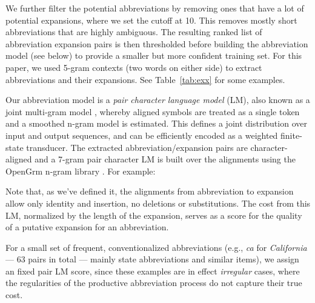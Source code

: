 \documentclass[11pt]{article}
\begin{document}
We further filter the potential abbreviations by removing ones that have a lot
of potential expansions, where we set the cutoff at 10. This removes mostly
short abbreviations that are highly ambiguous.  The resulting ranked list of
abbreviation expansion pairs is then thresholded before building the
abbreviation model (see below) to provide a smaller but more confident training
set. For this paper, we used 5-gram contexts (two words on either side) to
extract abbreviations and their expansions. See Table~\ref{tab:exx} for some
examples.

Our abbreviation model is a \emph{pair character language model} (LM), also
known as a joint multi-gram model \cite{bisani2008joint}, whereby aligned
symbols are treated as a single token and a smoothed n-gram model is
estimated. This defines a joint distribution over input and output sequences,
and can be efficiently encoded as a weighted finite-state transducer. The
extracted abbreviation/expansion pairs are character-aligned and a 7-gram pair
character LM is built over the alignments using the OpenGrm n-gram library
\cite{Roark:EtAl:12}.  For example:

\hspace*{0.3in}{\tt c:c $\epsilon$:e $\epsilon$:n t:t $\epsilon$:e r:r}

\noindent Note that, as we've defined it, the alignments from abbreviation to
expansion allow only identity and insertion, no deletions or substitutions. The
cost from this LM, normalized by the length of the expansion, serves as a score
for the quality of a putative expansion for an abbreviation.

For a small set of frequent, conventionalized abbreviations (e.g., \emph{ca} for
\emph{California} --- 63 pairs in total --- mainly state abbreviations and
similar items), we assign an fixed pair LM score, since these examples are in
effect \emph{irregular} cases, where the regularities of the productive
abbreviation process do not capture their true cost.

\vspace{-0.2cm}
\end{document}
